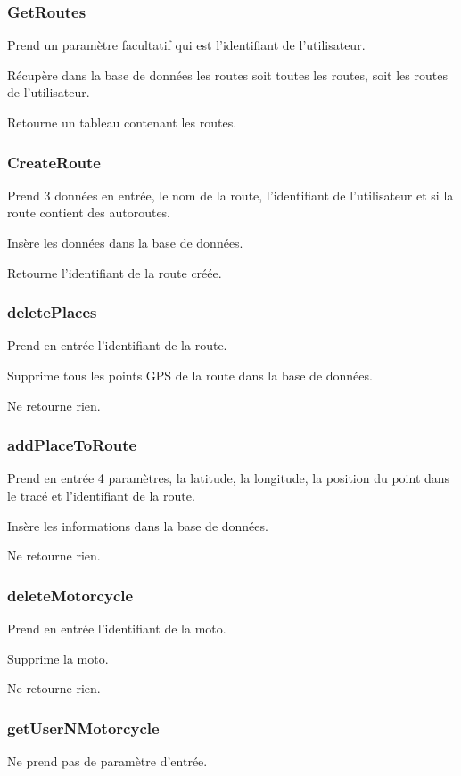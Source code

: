 \documentclass[a4paper]{article}
\begin{document}
\subsubsection{GetRoutes}
Prend un paramètre facultatif qui est l'identifiant de l'utilisateur.

Récupère dans la base de données les routes soit toutes les routes, soit les routes de l'utilisateur.

Retourne un tableau contenant les routes.

\subsubsection{CreateRoute}
Prend 3 données en entrée, le nom de la route, l'identifiant de l'utilisateur et si la route contient des autoroutes.

Insère les données dans la base de données.

Retourne l'identifiant de la route créée.

\subsubsection{deletePlaces}
Prend en entrée l'identifiant de la route.

Supprime tous les points GPS de la route dans la base de données.

Ne retourne rien.

\subsubsection{addPlaceToRoute}
Prend en entrée 4 paramètres, la latitude, la longitude, la position du point dans le tracé et l'identifiant de la route.

Insère les informations dans la base de données.

Ne retourne rien.

\subsubsection{deleteMotorcycle}
Prend en entrée l'identifiant de la moto.

Supprime la moto.

Ne retourne rien.

\subsubsection{getUserNMotorcycle}
Ne prend pas de paramètre d'entrée.
\end{document}

